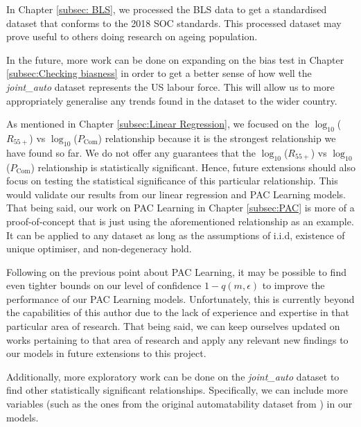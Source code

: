 \documentclass[11pt]{article}
\begin{document}
In Chapter \ref{subsec: BLS}, we processed the BLS data to get a standardised dataset that conforms to the 2018 SOC standards. This processed dataset may prove useful to others doing research on ageing population.

In the future, more work can be done on expanding on the bias test in Chapter \ref{subsec:Checking biasness} in order to get a better sense of how well the \emph{joint\_auto} dataset represents the US labour force. This will allow us to more appropriately generalise any trends found in the dataset to the wider country.

As mentioned in Chapter \ref{subsec:Linear Regression}, we focused on the $\log_{10}$($R_{55+}$) vs $\log_{10}$($P_{\text{Com}}$) relationship because it is the strongest relationship we have found so far. We do not offer any guarantees that the $\log_{10}$($R_{55+}$) vs $\log_{10}$($P_{\text{Com}}$) relationship is statistically significant. Hence, future extensions should also focus on testing the statistical significance of this particular relationship. This would validate our results from our linear regression and PAC Learning models. That being said, our work on PAC Learning in Chapter \ref{subsec:PAC} is more of a proof-of-concept that is just using the aforementioned relationship as an example. It can be applied to any dataset as long as the assumptions of i.i.d, existence of unique optimiser, and non-degeneracy hold.

Following on the previous point about PAC Learning, it may be possible to find even tighter bounds on our level of confidence $1 - q(m,\epsilon)$ to improve the performance of our PAC Learning models. Unfortunately, this is currently beyond the capabilities of this author due to the lack of experience and expertise in that particular area of research. That being said, we can keep ourselves updated on works pertaining to that area of research and apply any relevant new findings to our models in future extensions to this project.

Additionally, more exploratory work can be done on the \emph{joint\_auto} dataset to find other statistically significant relationships. Specifically, we can include more variables (such as the ones from the original automatability dataset from \cite{osborne2017future}) in our models.

\clearpage

\printbibliography[heading=bibintoc]

\clearpage

\appendix
\end{document}
